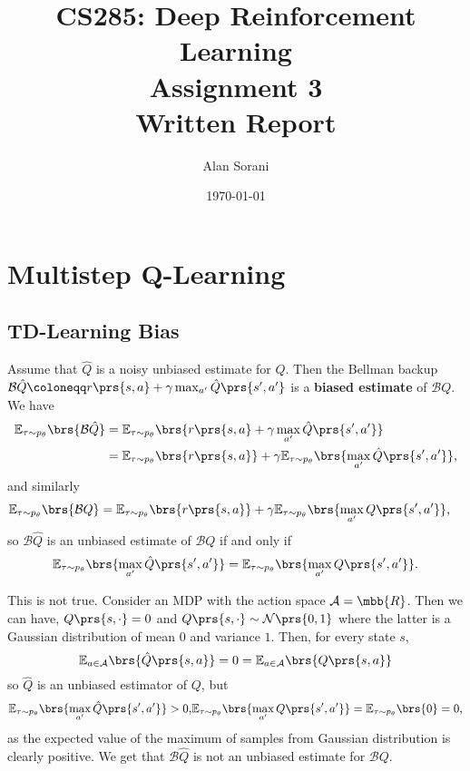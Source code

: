 \documentclass[10pt]{article}
\title{CS285: Deep Reinforcement Learning \\ Assignment 3 \\ Written Report}
\author{Alan Sorani}
\date{\today}
\theoremstyle{definition}
\begin{document}
\maketitle

\section{Multistep Q-Learning}

\subsection{TD-Learning Bias}

Assume that $\hat{Q}$ is a noisy unbiased estimate for $Q$. Then the Bellman backup $\mathcal{B}\hat{Q} \coloneqq r\prs{s,a} + \gamma \max_{a'} \hat{Q}\prs{s', a'}$ is a \textbf{biased estimate} of $\mathcal{B}Q$. We have
\begin{align*}
\mathbb{E}_{\tau \sim p_\theta}\brs{\mathcal{B}\hat{Q}}
&=
\mathbb{E}_{\tau \sim p_\theta}\brs{r\prs{s,a} + \gamma \max_{a'} \hat{Q}\prs{s', a'}}
\\&=
\mathbb{E}_{\tau \sim p_\theta}\brs{r\prs{s,a}} + \gamma \mathbb{E}_{\tau \sim p_\theta}\brs{\max_{a'} \hat{Q}\prs{s', a'}} \text{,}
\end{align*}
and similarly
\begin{align*}
\mathbb{E}_{\tau \sim p_\theta}\brs{\mathcal{B}{Q}}
&=
\mathbb{E}_{\tau \sim p_\theta}\brs{r\prs{s,a}} + \gamma \mathbb{E}_{\tau \sim p_\theta}\brs{\max_{a'} Q\prs{s', a'}} \text{,}
\end{align*}
so $\mathcal{B}\hat{Q}$ is an unbiased estimate of $\mathcal{B}Q$ if and only if
\[\mathbb{E}_{\tau \sim p_\theta}\brs{\max_{a'} \hat{Q}\prs{s', a'}} = \mathbb{E}_{\tau \sim p_\theta}\brs{\max_{a'} Q\prs{s', a'}} \text{.}\]

This is not true. Consider an MDP with the action space $\mathcal{A} = \mbb{R}$. Then we can have, $Q\prs{s,\cdot} = 0$ and $Q\prs{s,\cdot} \sim \mathcal{N}\prs{0,1}$ where the latter is a Gaussian distribution of mean $0$ and variance $1$.
Then, for every state $s$,
\[\mathbb{E}_{a \in \mathcal{A}}\brs{\hat{Q}\prs{s,a}} = 0 = \mathbb{E}_{a \in \mathcal{A}}\brs{Q\prs{s,a}}\]
so $\hat{Q}$ is an unbiased estimator of $Q$, but
\begin{align*}
\mathbb{E}_{\tau \sim p_\theta}\brs{\max_{a'} \hat{Q}\prs{s', a'}} > 0 \text{,}
\mathbb{E}_{\tau \sim p_\theta}\brs{\max_{a'} Q\prs{s', a'}} = \mathbb{E}_{\tau \sim p_\theta}\brs{0} = 0 \text{,}
\end{align*}
as the expected value of the maximum of samples from Gaussian distribution is clearly positive. We get that $\mathcal{B}\hat{Q}$ is not an unbiased estimate for $\mathcal{B}Q$.
\end{document}
